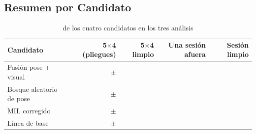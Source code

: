 \subsection{Resumen por Candidato}
\begin{table}[H]
\caption{\fmacro{} de los cuatro candidatos en los tres análisis}\label{tab:a-resumen}
{\singlespacing\small
\begin{tabular}{@{}lrrrr@{}}
\toprule
Candidato & 5$\times$4 (pliegues) & 5$\times$4 limpio & Una sesión afuera & Sesión limpio \\
\midrule
Fusión pose + visual & \FusionDevF{} $\pm$ \FusionDevDE{} & \FusionLimpioF{} & \FusionSesionF{} & \FusionSesionLimpioF{} \\
Bosque aleatorio de pose & \RFPoseDevF{} $\pm$ \RFPoseDevDE{} & \RFPoseLimpioF{} & \RFPoseSesionF{} & \RFPoseSesionLimpioF{} \\
MIL corregido & \MILDevF{} $\pm$ \MILDevDE{} & \MILLimpioF{} & \MILSesionF{} & \MILSesionLimpioF{} \\
Línea de base & \BaseDevF{} $\pm$ \BaseDevDE{} & \BaseLimpioF{} & \BaseSesionF{} & \BaseSesionLimpioF{} \\
\bottomrule
\end{tabular}}
\end{table}

